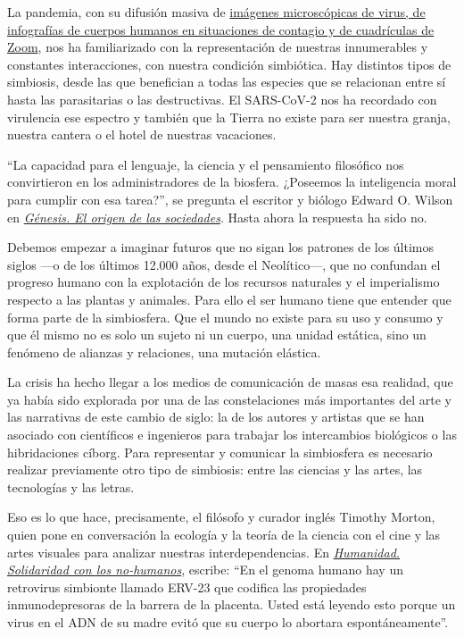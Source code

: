 La pandemia, con su difusión masiva de
\href{https://www.nytimes3xbfgragh.onion/es/2020/05/09/espanol/opinion/zoom-coronavirus.html}{imágenes
microscópicas de virus, de infografías de cuerpos humanos en situaciones
de contagio y de cuadrículas de Zoom}, nos ha familiarizado con la
representación de nuestras innumerables y constantes interacciones, con
nuestra condición simbiótica. Hay distintos tipos de simbiosis, desde
las que benefician a todas las especies que se relacionan entre sí hasta
las parasitarias o las destructivas. El SARS-CoV-2 nos ha recordado con
virulencia ese espectro y también que la Tierra no existe para ser
nuestra granja, nuestra cantera o el hotel de nuestras vacaciones.

``La capacidad para el lenguaje, la ciencia y el pensamiento filosófico
nos convirtieron en los administradores de la biosfera. ¿Poseemos la
inteligencia moral para cumplir con esa tarea?'', se pregunta el
escritor y biólogo Edward O. Wilson en
\href{https://www.planetadelibros.com/libro-genesis/311810}{\emph{Génesis.
El origen de las sociedades}}. Hasta ahora la respuesta ha sido no.

Debemos empezar a imaginar futuros que no sigan los patrones de los
últimos siglos ---o de los últimos 12.000 años, desde el Neolítico---,
que no confundan el progreso humano con la explotación de los recursos
naturales y el imperialismo respecto a las plantas y animales. Para ello
el ser humano tiene que entender que forma parte de la simbiosfera. Que
el mundo no existe para su uso y consumo y que él mismo no es solo un
sujeto ni un cuerpo, una unidad estática, sino un fenómeno de alianzas y
relaciones, una mutación elástica.

La crisis ha hecho llegar a los medios de comunicación de masas esa
realidad, que ya había sido explorada por una de las constelaciones más
importantes del arte y las narrativas de este cambio de siglo: la de los
autores y artistas que se han asociado con científicos e ingenieros para
trabajar los intercambios biológicos o las hibridaciones cíborg. Para
representar y comunicar la simbiosfera es necesario realizar previamente
otro tipo de simbiosis: entre las ciencias y las artes, las tecnologías
y las letras.

Eso es lo que hace, precisamente, el filósofo y curador inglés Timothy
Morton, quien pone en conversación la ecología y la teoría de la ciencia
con el cine y las artes visuales para analizar nuestras
interdependencias. En
\href{https://adrianahidalgo.es/tienda/los-sentidos/humanidad/}{\emph{Humanidad.
Solidaridad con los no-humanos}}, escribe: ``En el genoma humano hay un
retrovirus simbionte llamado ERV-23 que codifica las propiedades
inmunodepresoras de la barrera de la placenta. Usted está leyendo esto
porque un virus en el ADN de su madre evitó que su cuerpo lo abortara
espontáneamente''.

